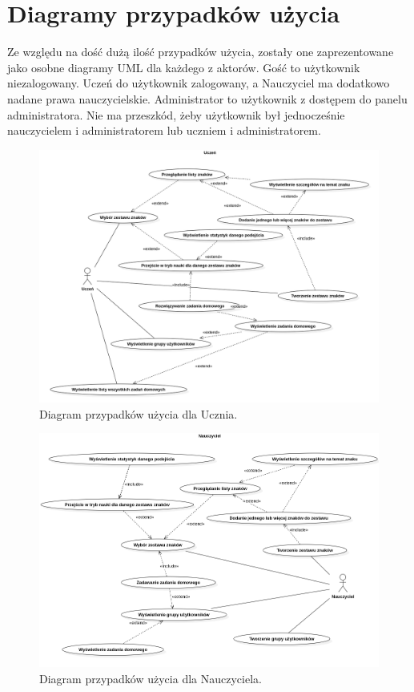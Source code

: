 \documentclass[a4paper,twoside,12pt]{book}
\begin{document}
\section{Diagramy przypadków użycia}
Ze względu na dość dużą ilość przypadków użycia, zostały one zaprezentowane jako osobne diagramy UML dla każdego z aktorów. Gość to użytkownik niezalogowany. Uczeń do użytkownik zalogowany, a Nauczyciel ma dodatkowo nadane prawa nauczycielskie. Administrator to użytkownik z dostępem do panelu administratora. Nie ma przeszkód, żeby użytkownik był jednocześnie nauczycielem i administratorem lub uczniem i administratorem.
\begin{figure}[]
\centering
\includegraphics[width=\textwidth]{Uczen}
\caption{Diagram przypadków użycia dla Ucznia.}
\label{fig:etykieta-rysunku}
\end{figure}
\begin{figure}[]
\centering
\includegraphics[width=\textwidth]{Nauczyciel}
\caption{Diagram przypadków użycia dla Nauczyciela.}
\label{fig:etykieta-rysunku}
\end{figure}
\end{document}
